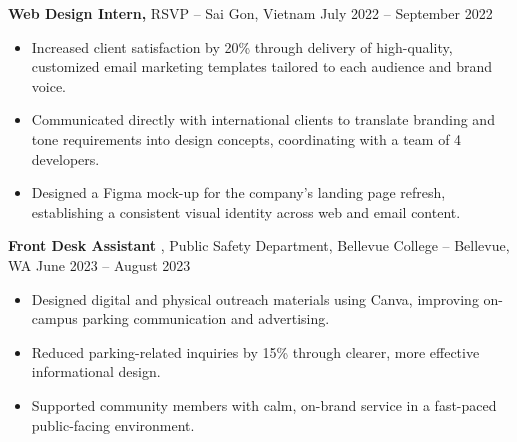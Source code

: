 \documentclass[11pt]{article}       %
\begin{document}

\textbf{Web Design Intern,} {RSVP} -- Sai Gon, Vietnam \hfill July 2022 -- September 2022 \\
\vspace{-9pt}
\begin{itemize}
  \item Increased client satisfaction by 20\% through delivery of high-quality, customized email marketing templates tailored to each audience and brand voice.
  \item Communicated directly with international clients to translate branding and tone requirements into design concepts, coordinating with a team of 4 developers.
  \item Designed a Figma mock-up for the company's landing page refresh, establishing a consistent visual identity across web and email content.
\end{itemize}

\textbf{Front Desk Assistant} {, Public Safety Department, Bellevue College} -- Bellevue, WA \hfill June 2023 -- August 2023 \\
\vspace{-9pt}
\begin{itemize}
  \item Designed digital and physical outreach materials using Canva, improving on-campus parking communication and advertising.
  \item Reduced parking-related inquiries by 15\% through clearer, more effective informational design.
  \item Supported community members with calm, on-brand service in a fast-paced public-facing environment.
\end{itemize}
\end{document}
